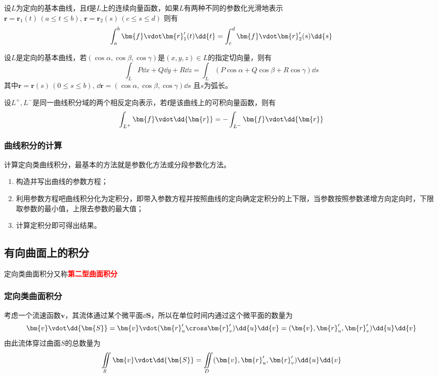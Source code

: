 \begin{theorem}
    设$L$为定向的基本曲线，且$\bm{f}$是$L$上的连续向量函数，如果$L$有两种不同的参数化光滑地表示$\bm{r} = \bm{r}_1(t)\,(a\leq t\leq b),\, \bm{r}=\bm{r}_2(s)\, (c\leq s \leq d)$
    则有
    \[ \int_a^b \bm{f}\vdot\bm{r}_1'(t)\dd{t} = \int_c^d \bm{f}\vdot\bm{r}_2'(s)\dd{s} \]
\end{theorem}

\begin{theorem}
    设$L$是定向的基本曲线，若$(\cos\alpha,\cos\beta,\cos\gamma)$是$(x,y,z)\in L$的指定切向量，则有
    \[ \int_L P\dd{x} + Q\dd{y} + R\dd{z} = \int_L (P\cos\alpha + Q\cos\beta + R\cos\gamma)\dd{s} \]
    其中$\bm{r} =\bm{r}(s)\,(0\leq s\leq b),\, \dd{\bm{r}} = (\cos\alpha,\cos\beta,\cos\gamma)\dd{s}$
    且$s$为弧长。
\end{theorem}

\begin{theorem}
    设$L^+, L^-$是同一曲线积分域的两个相反定向表示，若$\bm{f}$是该曲线上的可积向量函数，则有
    \[ \int_{L^+} \bm{f}\vdot\dd{\bm{r}} = - \int_{L^-}\bm{f}\vdot\dd{\bm{r}} \]
\end{theorem}

\subsubsection{曲线积分的计算}
计算定向类曲线积分，最基本的方法就是参数化方法或分段参数化方法。
\begin{enumerate}[(1)]
    \item 构造并写出曲线的参数方程；
    \item 利用参数方程吧曲线积分化为定积分，即带入参数方程并按照曲线的定向确定定积分的上下限，当参数按照参数递增方向定向时，下限取参数的最小值，上限去参数的最大值；
    \item 计算定积分即可得出结果。
\end{enumerate}

\subsection{有向曲面上的积分}
定向类曲面积分又称\textcolor{red}{\textbf{\textsf{第二型曲面积分}}}
\subsubsection{定向类曲面积分}
考虑一个流速函数$\bm{v}$，其流体通过某个微平面$\dd{\bm{S}}$，所以在单位时间内通过这个微平面的数量为
\[ \bm{v}\vdot\dd{\bm{S}} = \bm{v}\vdot(\bm{r}'_u \cross \bm{r}'_v)\dd{u}\dd{v} = (\bm{v},\bm{r}'_u,\bm{r}'_v)\dd{u}\dd{v} \]
由此流体穿过曲面$S$的总数量为
\[ \iint\limits_S \bm{v}\vdot\dd{\bm{S}} = \iint\limits_D (\bm{v},\bm{r}'_u,\bm{r}'_v)\dd{u}\dd{v} \]

